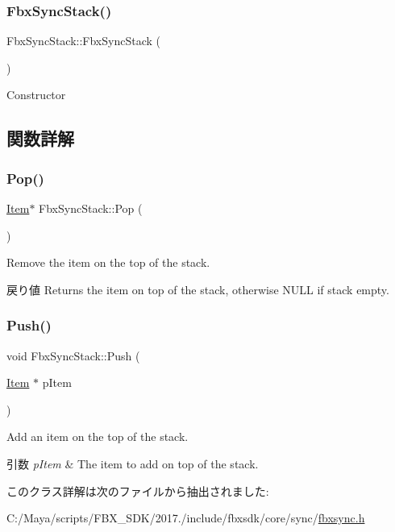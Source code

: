 \subsubsection{\texorpdfstring{Fbx\+Sync\+Stack()}{FbxSyncStack()}}
{\footnotesize\ttfamily Fbx\+Sync\+Stack\+::\+Fbx\+Sync\+Stack (\begin{DoxyParamCaption}{ }\end{DoxyParamCaption})}



Constructor 



\subsection{関数詳解}
\mbox{\label{class_fbx_sync_stack_a13b7a3879bf1dab796985893597d443f}} 
\subsubsection{\texorpdfstring{Pop()}{Pop()}}
{\footnotesize\ttfamily \hyperlink{struct_fbx_sync_stack_1_1_item}{Item}$\ast$ Fbx\+Sync\+Stack\+::\+Pop (\begin{DoxyParamCaption}{ }\end{DoxyParamCaption})}

Remove the item on the top of the stack. \begin{DoxyReturn}{戻り値}
Returns the item on top of the stack, otherwise N\+U\+LL if stack empty. 
\end{DoxyReturn}
\mbox{\label{class_fbx_sync_stack_a1412ced243b15737a27bb4a3b30bd40b}} 
\subsubsection{\texorpdfstring{Push()}{Push()}}
{\footnotesize\ttfamily void Fbx\+Sync\+Stack\+::\+Push (\begin{DoxyParamCaption}\item[{\hyperlink{struct_fbx_sync_stack_1_1_item}{Item} $\ast$}]{p\+Item }\end{DoxyParamCaption})}

Add an item on the top of the stack. 
\begin{DoxyParams}{引数}
{\em p\+Item} & The item to add on top of the stack. \\
\hline
\end{DoxyParams}


このクラス詳解は次のファイルから抽出されました\+:\begin{DoxyCompactItemize}
\item 
C\+:/\+Maya/scripts/\+F\+B\+X\+\_\+\+S\+D\+K/2017./include/fbxsdk/core/sync/\hyperlink{fbxsync_8h}{fbxsync.\+h}\end{DoxyCompactItemize}
